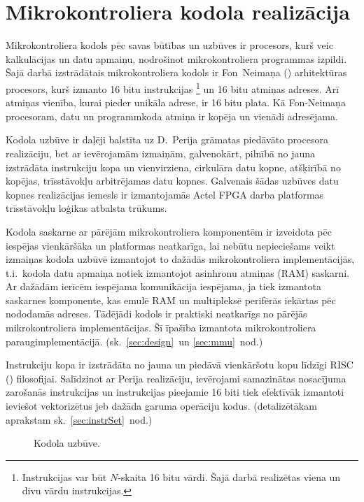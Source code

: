 \section{Mikrokontroliera kodola realizācija} \label{sec:cpu}
	Mikrokontroliera kodols pēc savas būtības un uzbūves ir procesors,
	kurš veic kalkulācijas un datu apmaiņu, nodrošinot mikrokontroliera
	programmas izpildi.
	Šajā darbā izstrādātais mikrokontroliera kodols ir 
	Fon~Neimaņa () arhitektūras pro\-ce\-sors, kurš
	izmanto 16 bitu instrukcijas%
		\footnote{Instrukcijas var būt $N$-skaita 16 bitu vārdi. 
		Šajā darbā realizētas viena un divu vārdu instrukcijas.}
	un 16 bitu atmiņas adreses. Arī atmiņas vienība, kurai pieder unikāla
	adrese, ir 16 bitu plata. Kā Fon-Neimaņa procesoram, datu un
	programmkoda atmiņa ir kopēja un vienādi adresējama.
	
	Kodola uzbūve ir daļēji balstīta uz D.~Perija grāmatas%
	\cite{Perry-VHDL} piedāvāto procesora reali\-zā\-ciju, 
	bet ar ievērojamām izmaiņām, galvenokārt, pilnībā no jauna izstrādāta 
	instrukciju kopa un vienvirziena,
	cirkulāra datu kopne, atšķirībā no kopējas,
	trīs\-stāvokļu arbitrējamas datu kopnes.
	Galvenais šādas uzbūves datu kopnes realizācijas iemesls
	ir izmantojamās Actel FPGA darba platformas trīs\-stāvokļu
	loģikas atbalsta \mbox{trūkums.\cite[18.~lpp.]{FusionFAQ}}
	
	Kodola saskarne ar pārējām mikrokontroliera komponentēm ir izveidota
	pēc iespējas vienkāršāka un platformas neatkarīga, lai nebūtu nepieciešams
	veikt izmaiņas kodola uzbūvē izmantojot to dažādās mikrokontroliera
	implementācijās, t.i.~kodola datu apmaiņa notiek izmantojot
	asinhronu atmiņas (RAM)	saskarni. Ar dažādām ierīcēm iespējama
	komunikācija iespējama, ja tiek izmantota saskarnes komponente, kas
	emulē RAM un multipleksē perifērās iekārtas pēc nododamās adreses.
	Tādējādi kodols	ir praktiski neatkarīgs no pārējās 
	mikrokontroliera implementācijas.
	Šī īpašība izmantota mikrokontroliera paraugimplementācijā.
	(sk.~\ref{sec:design}~un \ref{sec:mmu}~nod.)
	
	Instrukciju kopa ir izstrādāta no jauna un piedāvā vienkāršotu
	kopu līdzīgi RISC ()
	filo\-so\-fijai. Salīdzinot ar Perija realizāciju, ievērojami samazinātas
	nosacījuma zarošanās instrukcijas un instrukcijas pieejamie 16 biti
	tiek efektīvāk izmantoti ieviešot vektorizētus jeb dažāda garuma
	operāciju kodus. (detalizētākam aprakstam sk.~\ref{sec:instrSet}~nod.)
	
	
	\begin{figure}[thb]
		\centering
		\def\svgwidth{\textwidth}
		{\ttfamily\footnotesize}
		\caption{Kodola uzbūve.}
		\label{fig:cpu-rev3}
	\end{figure}
	
	 \pagebreak[3]
	
